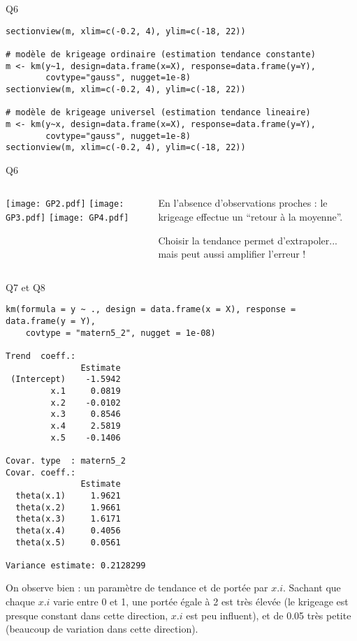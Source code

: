 \documentclass{beamer}
\begin{document}
\begin{frame}[fragile]{Q6}
 \begin{Verbatim}[fontsize=\small]
sectionview(m, xlim=c(-0.2, 4), ylim=c(-18, 22))

# modèle de krigeage ordinaire (estimation tendance constante)
m <- km(y~1, design=data.frame(x=X), response=data.frame(y=Y), 
        covtype="gauss", nugget=1e-8)
sectionview(m, xlim=c(-0.2, 4), ylim=c(-18, 22))

# modèle de krigeage universel (estimation tendance lineaire)
m <- km(y~x, design=data.frame(x=X), response=data.frame(y=Y), 
        covtype="gauss", nugget=1e-8)
sectionview(m, xlim=c(-0.2, 4), ylim=c(-18, 22))
\end{Verbatim}
\end{frame}
\begin{frame}[fragile]{Q6}
\begin{columns}
 \begin{column}{.49\textwidth}
  \texttt{[image: GP2.pdf]}
\texttt{[image: GP3.pdf]} 
\texttt{[image: GP4.pdf]} 
 \end{column}
 \begin{column}{.49\textwidth}
 En l'absence d'observations proches : le krigeage effectue un ``retour à la moyenne''.
 \smallskip
 
  Choisir la tendance permet d'extrapoler... mais peut aussi amplifier l'erreur !

 \end{column}
\end{columns}
\end{frame}
\begin{frame}[fragile]{Q7 et Q8}
 \begin{Verbatim}[fontsize=\tiny]
km(formula = y ~ ., design = data.frame(x = X), response = data.frame(y = Y), 
    covtype = "matern5_2", nugget = 1e-08)

Trend  coeff.:
               Estimate
 (Intercept)    -1.5942
         x.1     0.0819
         x.2    -0.0102
         x.3     0.8546
         x.4     2.5819
         x.5    -0.1406

Covar. type  : matern5_2 
Covar. coeff.:
               Estimate
  theta(x.1)     1.9621
  theta(x.2)     1.9661
  theta(x.3)     1.6171
  theta(x.4)     0.4056
  theta(x.5)     0.0561

Variance estimate: 0.2128299
\end{Verbatim}
On observe bien : un paramètre de tendance et de portée par $x.i$. Sachant que chaque $x.i$ varie entre 0 et 1, une portée égale à 2 est très élevée (le krigeage est presque constant dans cette direction, $x.i$ est peu influent), 
et de 0.05 très petite (beaucoup de variation dans cette direction).
\end{frame}
\end{document}
